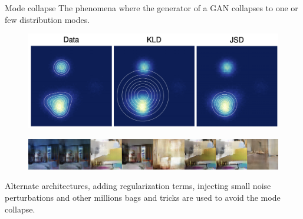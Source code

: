 \begin{frame}{Mode collapse}
	The phenomena where the generator of a GAN collapses to one or few distribution modes.
	\vspace{-0.15cm}
	\begin{figure}
		\centering
		\includegraphics[width=0.75\linewidth]{figs/mode_collapse_1}
	\end{figure}
	\vspace{-0.3cm}
	\begin{figure}
		\centering
		\includegraphics[width=1.0\linewidth]{figs/mode_collapse_4}
	\end{figure}
	Alternate architectures, adding regularization terms, injecting small noise
	perturbations and other millions bags and tricks are used to avoid the mode collapse.
	
\end{frame}
